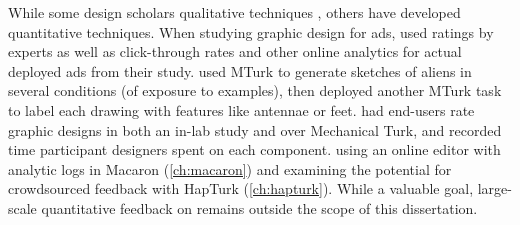 
While some design scholars  qualitative techniques \cite{Schon1982,Cross2007,Cross2011}, others have developed quantitative techniques.
When studying graphic design for ads, \citet{Dow2011} used ratings by experts as well as click-through rates and other online analytics for actual deployed ads from their study.
\citet{Kulkarni2014} used MTurk to generate sketches of aliens in several conditions (of exposure to examples), then deployed another MTurk task to label each drawing with features like antennae or feet.
\citet{Lee2010a} had end-users rate graphic designs in both an in-lab study and over Mechanical Turk, and recorded time participant designers spent on each component.
 using an online editor with analytic logs in Macaron (\autoref{ch:macaron}) and examining the potential for crowdsourced feedback with HapTurk (\autoref{ch:hapturk}).
While a valuable goal, large-scale quantitative feedback on \haxd remains outside the scope of this dissertation.

